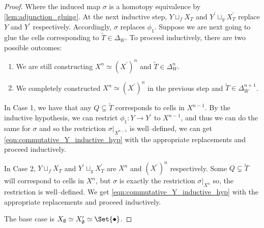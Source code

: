 \documentclass[class=article, crop=false]{standalone}
\begin{document}
\begin{proof}
    Where the induced map $\sigma$ is a homotopy equivalence by \cref{lem:adjunction_gluing}. At the next inductive step, $Y \sqcup_f X_T$ and $Y^\prime\sqcup_g X^\prime_T$ replace $Y$ and $Y^\prime$ respectively. Accordingly, $\sigma$ replaces $\phi_1$. Suppose we are next going to glue the cells corresponding to $\tilde{T} \in \Delta_W$. To proceed inductively, there are two possible outcomes:
    \begin{enumerate}
        \item We are still constructing $X^n \simeq (X^\prime)^n$ and $\tilde{T} \in \Delta_W^n$.
        \item We completely constructed $X^n \simeq (X^\prime)^n$ in the previous step and $\tilde{T} \in \Delta_W^{n+1}$.
    \end{enumerate}
    
    In Case 1, we have that any $Q \subsetneq \tilde{T}$ corresponds to cells in $X^{n-1}$. By the inductive hypothesis, we can restrict $\phi_1 \colon Y \to Y^\prime$ to $X^{n-1}$, and thus we can do the same for $\sigma$ and so the restriction $\sigma|_{X^{n-1}}$ is well--defined, we can get \eqref{eqn:commutative_Y_inductive_hyp} with the appropriate replacements and proceed inductively. 

    In Case 2, $Y \sqcup_f X_T$ and $Y^\prime\sqcup_g X^\prime_T$ are $X^n$ and $(X^\prime)^n$ respectively. Some $Q\subsetneq \tilde{T}$ will correspond to cells in $X^n$, but $\sigma$ is exactly the restriction $\sigma|_{X^n}$ so, the restriction is well--defined. We get \eqref{eqn:commutative_Y_inductive_hyp} with the appropriate replacements and proceed inductively.

    The base case is $X_\emptyset \simeq X^\prime_\emptyset \simeq \Set{\bullet}$.
\end{proof}
\end{document}
